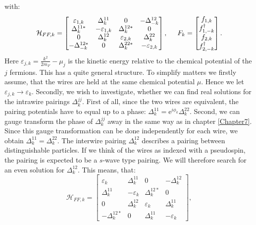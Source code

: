 with:
\begin{equation}
\mathcal{H}_{FF,k} = \begin{bmatrix} \varepsilon_{1,k} & \Delta^{11}_k      & 0                 & -\Delta^{12}_{-k} \\ 
                                     \Delta^{11 *}_k   & -\varepsilon_{1,k} & \Delta^{12*}_k    & 0 \\ 
                                    0                  & \Delta^{12}_k      & \varepsilon_{2,k} & \Delta^{22}_k \\ 
                                     -\Delta^{12*}_{-k}& 0                  & \Delta^{22*}_k    & -\varepsilon_{2,k} \end{bmatrix}, \hspace{0.5cm}
F_k =  \begin{bmatrix} f_{1,k} \\ f^\dagger_{1,-k} \\ f_{2,k} \\ f^\dagger_{2,-k} \end{bmatrix}.                                     
\end{equation}
Here $\varepsilon_{j,k} = \frac{k^2}{2m_F}-\mu_j$ is the kinetic energy relative to the chemical potential of the $j$ fermions. This has a quite general structure. To simplify matters we firstly assume, that the wires are held at the same chemical potential $\mu$. Hence we let $\varepsilon_{j,k} \to \varepsilon_k$. Secondly, we wish to investigate, whether we can find real solutions for the intrawire pairings $\Delta^{jj}_k$. First of all, since the two wires are equivalent, the pairing potentials have to equal up to a phase: $\Delta^{11}_k = \text{e}^{i\phi_k} \Delta^{22}_k$. Second, we can gauge transform the phase of $\Delta^{jj}_k$ away in the same way as in chapter \ref{Chapter7}. Since this gauge transformation can be done independently for each wire, we obtain $\Delta^{11}_k = \Delta^{22}_k$. The interwire pairing $\Delta^{12}_k$ describes a pairing between distinguishable particles. If we think of the wires as indexed with a pseudospin, the pairing is expected to be a $s$-wave type pairing. We will therefore search for an even solution for $\Delta^{12}_k$. This means, that:
\begin{equation}
\mathcal{H}_{FF,k} = \begin{bmatrix} \varepsilon_{k}   & \Delta^{11}_k      & 0                 & -\Delta^{12}_{k} \\ 
                                     \Delta^{11}_k     & -\varepsilon_{k}   & \Delta^{12*}_k    & 0 \\ 
                                    0                  & \Delta^{12}_k      & \varepsilon_{k}   & \Delta^{11}_k \\ 
                                     -\Delta^{12*}_{k} & 0                  & \Delta^{11}_k     & -\varepsilon_{k} \end{bmatrix},                  
\end{equation}
